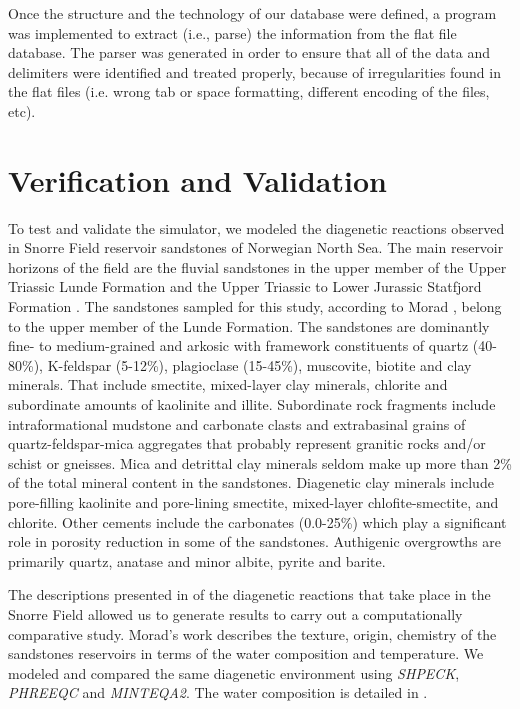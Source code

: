 \documentclass[preprint,12pt,3p]{elsarticle}
\begin{document}
Once the structure and the technology of our database were defined, a program was implemented to extract (i.e., parse) the information from the flat file database. 
The parser was generated in order to ensure that all of the data and delimiters were identified and treated properly, because of irregularities found in the flat files (i.e. wrong tab or space formatting, different encoding of the files, etc).

\section{Verification and Validation}
To test and validate the simulator, we modeled the diagenetic reactions observed in Snorre Field reservoir sandstones of Norwegian North Sea. The main reservoir horizons of the field are the fluvial sandstones in the upper member of the Upper Triassic Lunde Formation and the Upper Triassic to Lower Jurassic Statfjord Formation \cite{Hollander:87}. The sandstones sampled for this study, according to Morad \cite{Morad:90}, belong to the upper member of the Lunde Formation. The sandstones are dominantly fine- to medium-grained and arkosic with framework constituents of quartz (40-80\%), K-feldspar (5-12\%), plagioclase (15-45\%), muscovite, biotite and clay minerals. That include smectite, mixed-layer clay minerals, chlorite and subordinate amounts of kaolinite and illite. Subordinate rock fragments include intraformational mudstone and carbonate clasts and extrabasinal grains of quartz-feldspar-mica aggregates that probably represent granitic rocks and/or schist or gneisses. Mica and detrittal clay minerals seldom make up more than 2\% of the total mineral content in the sandstones. Diagenetic clay minerals include pore-filling kaolinite and pore-lining smectite, mixed-layer chlofite-smectite, and chlorite. Other cements include the carbonates (0.0-25\%) which play a significant role in porosity reduction in some of the sandstones. Authigenic overgrowths are primarily quartz, anatase and minor albite, pyrite and barite.

The descriptions presented in \cite{Morad:90} of the diagenetic reactions that take place in the Snorre Field allowed us to generate results to carry out a computationally comparative study. Morad's work describes the texture, origin, chemistry of the sandstones reservoirs in terms of the water composition and temperature. We modeled and compared the same diagenetic environment using \emph{SHPECK}, \emph{PHREEQC} and \emph{MINTEQA2}. The water composition is detailed in \cite{Nordstrom:79}.
\end{document}
